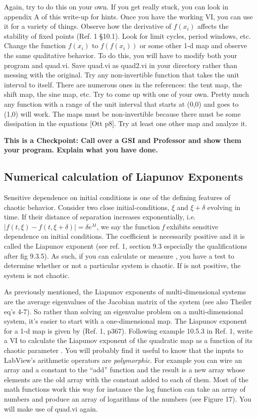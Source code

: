 \documentclass{../lab}
\begin{document}
Again, try to do this on your own. If you get really stuck, you can look in appendix A of this write-up for hints. Once you have the working VI, you can use it for a variety of things. Observe how the derivative of $ f(x_i) $ affects the stability of fixed points (Ref. 1 §10.1). Look for limit cycles, period windows, etc. Change the function $ f(x_i) $ to $ f(f(x_i)) $ or some other 1-d map and observe the same qualitative behavior. To do this, you will have to modify both your program and quad.vi. Save quad.vi as quad2.vi in your directory rather than messing with the original. Try any non-invertible function that takes the unit interval to itself. There are numerous ones in the references: the tent map, the shift map, the sine map, etc. Try to come up with one of your own. Pretty much any function with a range of the unit interval that starts at (0,0) and goes to (1,0) will work. The maps must be non-invertible because there must be some dissipation in the equations [Ott p8]. Try at least one other map and analyze it.


\textbf{ This is a Checkpoint: Call over a GSI and Professor and show them your program. Explain what you have done. }

\subsection{Numerical calculation of Liapunov Exponents}

Sensitive dependence on initial conditions is one of the defining features of chaotic behavior. Consider two close initial-conditions, $ \xi $ and $ \xi +\delta $ evolving in time. If their distance of separation increases exponentially, i.e. $ |f(t,\xi)-f(t,\xi +\delta)|=\delta e^{\lambda t} $, we say the function \emph{f} exhibits sensitive dependence on initial conditions. The coefficient is necessarily positive and it is called the Liapunov exponent (see ref. 1, section 9.3 especially the qualifications after fig 9.3.5). As such, if you can calculate or measure , you have a test to determine whether or not a particular system is chaotic. If is not positive, the system is not chaotic.

As previously mentioned, the Liapunov exponents of multi-dimensional systems are the average eigenvalues of the Jacobian matrix of the system (see also Theiler eq's 4-7). So rather than solving an eigenvalue problem on a multi-dimensional system, it's easier to start with a one-dimensional map. The Liapunov exponent for a 1-d map is given by (Ref. 1, p367). Following example 10.5.3 in Ref. 1, write a VI to calculate the Liapunov exponent of the quadratic map as a function of its chaotic parameter . You will probably find it useful to know that the inputs to LabView's arithmetic operators are \emph{polymorphic}. For example you can wire an array and a constant to the ``add'' function and the result is a new array whose elements are the old array with the constant added to each of them. Most of the math functions work this way for instance the log function can take an array of numbers and produce an array of logarithms of the numbers (see Figure 17). You will make use of quad.vi again.
\end{document}
